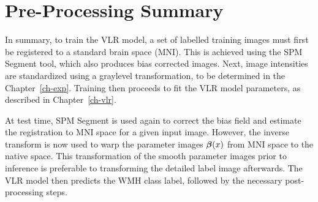 \section{Pre-Processing Summary}
In summary, to train the VLR model,
a set of labelled training images must first be registered to a standard brain space (MNI).
This is achieved using the SPM Segment tool, which also produces bias corrected images.
Next, image intensities are standardized using a graylevel transformation,
to be determined in the Chapter~\ref{ch-exp}.
Training then proceeds to fit the VLR model parameters, as described in Chapter~\ref{ch-vlr}.
\par
At test time, SPM Segment is used again to
correct the bias field and estimate the registration to MNI space for a given input image.
However, the inverse transform is now used to warp the parameter images $\bm{\beta}(x)$
from MNI space to the native space.
This transformation of the smooth parameter images prior to inference is preferable
to transforming the detailed label image afterwards.
The VLR model then predicts the WMH class label, followed by the necessary post-processing steps.
